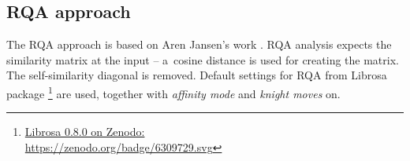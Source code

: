 \documentclass{ExcelAtFIT}
\begin{document}
\begin{table}[hbt!]
\centering
\caption{Results of the baseline DTW system on "Sub eval" dataset.}
\label{tab:BaseDTW}
\end{table}
\subsection{RQA approach}
The RQA approach is based on Aren Jansen's work \cite{ArenJansen}. RQA analysis expects the similarity matrix at the input -- a~cosine distance is used for creating the matrix. The self-similarity diagonal is removed. Default settings for RQA from Librosa package \footnote{\href{https://zenodo.org/badge/6309729.svg}{Librosa 0.8.0 on Zenodo:\\https://zenodo.org/badge/6309729.svg}} are used, together with \textit{affinity mode} and \textit{knight moves} on.
\end{document}
